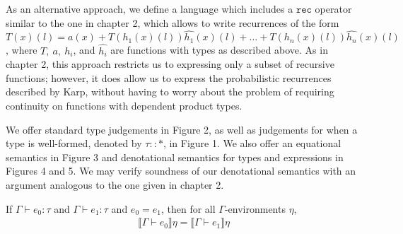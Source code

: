 As an alternative approach, we define a language which includes a $\texttt{rec}$ operator similar to the one in chapter 2,
 which allows to write recurrences of the form 
 $T(x)(l) = a(x) + T(h_1(x)(l))\hat{h_1}(x)(l) + \ldots + T(h_n(x)(l))\hat{h_n}(x)(l)$, where $T, \ a, \ h_i$, and $\hat{h_i}$ 
 are functions with types as described above. As in chapter 2, this approach restricts us to expressing only a subset
 of recursive functions; however, it does allow us to express the probabilistic recurrences described by Karp,
 without having to worry about the problem of requiring continuity on functions with dependent product types. 

We offer standard type judgements in Figure 2, as well as judgements for when a type is well-formed, denoted by
 $\tau :: *$, in Figure 1. We 
 also offer an equational semantics in Figure 3 and denotational semantics for types and expressions in Figures 4 and 5. 
 We may verify soundness of our denotational semantics with an argument analogous to the one given in chapter 2. 
 
  \begin{thm}
  If $\Gamma \vdash e_0 : \tau$ and $\Gamma \vdash e_1 : \tau$ and $e_0 = e_1$, then for all $\Gamma$-environments
  $\eta$,   
 \begin{align*}
 \llbracket \Gamma \vdash e_0 \rrbracket \eta 
 = \llbracket \Gamma \vdash e_1 \rrbracket \eta 
 \end{align*} 
 \end{thm}

